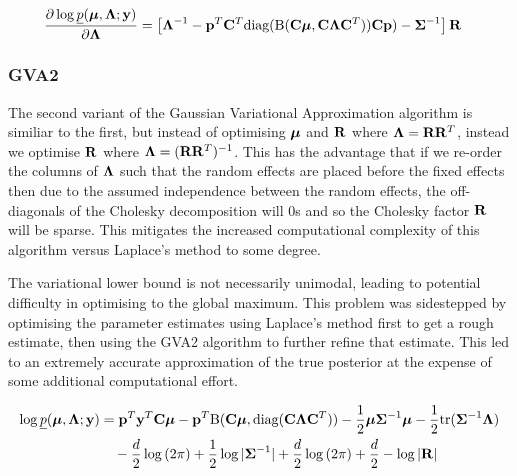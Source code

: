 \documentclass{article}[12pt]
\begin{document}
\begin{align*}
\frac{\partial \log \underline{p}({\boldsymbol \mu}, {\boldsymbol \Lambda}; {\bf y})}{\partial {\boldsymbol\Lambda}} &= \left [{\boldsymbol \Lambda}^{-1} - {\bf p}^T {\bf C}^T \text{diag}({\text{B}}({\bf C} {\boldsymbol \mu}, {\bf C} {\boldsymbol \Lambda} {\bf C}^T)) {\bf C} {\bf p}) - {\boldsymbol \Sigma}^{-1} \right ] {\bf R}
\end{align*} 
 
\subsubsection{GVA2}
The second variant of the Gaussian Variational Approximation algorithm is similiar to
the first, but instead of optimising ${\boldsymbol \mu}$ and ${\bf R}$ where ${\boldsymbol \Lambda}={\bf R} {\bf R}^T$,
instead we optimise ${\bf R}$ where ${\boldsymbol \Lambda} = ({\bf R} {\bf R}^T)^{-1}$.
This has the advantage that if we re-order the columns of ${\boldsymbol \Lambda}$ such that
the random effects are placed before the fixed effects then due to the assumed 
independence between the random effects, the off-diagonals of the Cholesky decomposition
will 0s and so the Cholesky factor ${\bf R}$ will be sparse. This mitigates the increased
computational complexity of this algorithm versus Laplace's method to some degree.


\noindent The variational lower bound is not necessarily unimodal, leading to potential
difficulty in optimising to the global maximum. This problem was sidestepped by
optimising the parameter estimates using Laplace's method first to get a rough
estimate, then using the GVA2 algorithm to further refine that estimate. This led
to an extremely accurate approximation of the true posterior at the expense of some
additional computational effort.

\begin{align*}
\log \underline{p}({\boldsymbol \mu}, {\boldsymbol \Lambda}; {\bf y}) &= {\bf p}^T{\bf y}^T{\bf C} {\boldsymbol \mu} - {\bf p}^T {\text{B}}({\bf C} {\boldsymbol \mu}, \text{diag}({\bf C} {\boldsymbol \Lambda} {\bf C}^T)) - {\frac{1}{2}} {\boldsymbol \mu} {\boldsymbol \Sigma}^{-1} {\boldsymbol \mu} - {\frac{1}{2}} \text{tr}{({\boldsymbol\Sigma}^{-1} {\boldsymbol\Lambda})} \\
&\quad- \frac{d}{2} \log{(2 \pi)} + {\frac{1}{2}} \log{|{\boldsymbol\Sigma}^{-1}|} + \frac{d}{2} \log{(2 \pi)} + \frac{d}{2} - \log{|{\bf R}|}
\end{align*}
\end{document}
